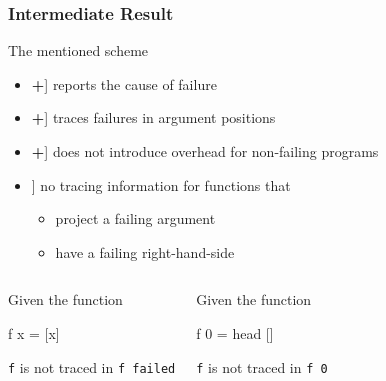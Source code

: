 \documentclass[
,hyperref={pdfpagelabels=false}
,xcolor=dvipsnames
]{beamer}
\newcommand{\pro}{\makebox[1ex]{\color{Green}\bfseries +}}
\newcommand{\con}{\makebox[1ex]{\color{Red}  \bfseries \textendash}}
\begin{document}
\begin{frame}[fragile]%
\frametitle{Intermediate Result}

The mentioned scheme

\begin{itemize}
\item[\pro] reports the cause of failure
\item[\pro] traces failures in argument positions
\item[\pro] does not introduce overhead for non-failing programs
\item[\con] no tracing information for functions that
\begin{itemize}
\item project a failing argument
\item have a failing right-hand-side
\end{itemize}
\end{itemize}

\pause

\vspace{-.5cm}

\begin{columns}[t]
\begin{example}
Given the function
\begin{program}
f x = [x]
\end{program}
\verb!f! is not traced in \verb!f failed!
\end{example}

\pause

\begin{example}
Given the function
\begin{program}
f 0 = head []
\end{program}
\verb!f! is not traced in \verb!f 0!
\end{example}
\end{columns}
\end{frame}
\end{document}
